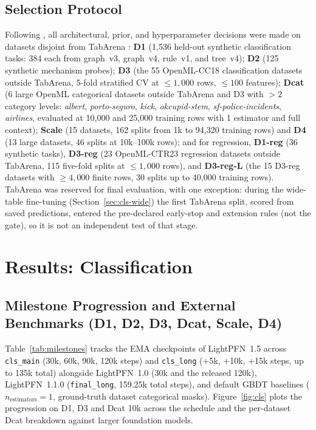\documentclass[11pt]{article}
\begin{document}
\subsection{Selection Protocol}
\label{sec:protocol}

Following \cite[Section~3]{ottoboni2026lightpfn}, all architectural, prior, and hyperparameter decisions were made on datasets disjoint from TabArena \cite{tabarena}:
\textbf{D1} (1,536 held-out synthetic classification tasks: 384 each from graph~v3, graph~v4, rule~v1, and tree~v4);
\textbf{D2} (125 synthetic mechanism probes);
\textbf{D3} (the 55 OpenML-CC18 classification datasets outside TabArena, 5-fold stratified CV at $\le 1{,}000$ rows, $\le 100$ features);
\textbf{Dcat} (6 large OpenML categorical datasets outside TabArena and D3 with $>2$ category levels: \emph{albert}, \emph{porto-seguro}, \emph{kick}, \emph{okcupid-stem}, \emph{sf-police-incidents}, \emph{airlines}, evaluated at 10,000 and 25,000 training rows with 1 estimator and full context); %
\textbf{Scale} (15 datasets, 162 splits from 1k to 94,320 training rows) and \textbf{D4} (13 large datasets, 46 splits at 10k--100k rows);
and for regression, \textbf{D1-reg} (36 synthetic tasks), \textbf{D3-reg} (23 OpenML-CTR23 regression datasets outside TabArena, 115 five-fold splits at $\le 1{,}000$ rows), and \textbf{D3-reg-L} (the 15 D3-reg datasets with $\ge 4{,}000$ finite rows, 30 splits up to 40,000 training rows). %
TabArena was reserved for final evaluation, with one exception: during the wide-table fine-tuning (Section~\ref{sec:cls-wide}) the first TabArena split, scored from saved predictions, entered the pre-declared early-stop and extension rules (not the gate), so it is not an independent test of that stage.

\section{Results: Classification}
\label{sec:cls-results}

\subsection{Milestone Progression and External Benchmarks (D1, D2, D3, Dcat, Scale, D4)}
\label{sec:cls-milestones}

Table~\ref{tab:milestones} tracks the EMA checkpoints of LightPFN~1.5 across \texttt{cls\_main} (30k, 60k, 90k, 120k steps) and \texttt{cls\_long} (+5k, +10k, +15k steps, up to 135k total) alongside LightPFN~1.0 (30k and the released 120k), LightPFN~1.1.0 (\texttt{final\_long}, 159.25k total steps), and default GBDT baselines ($n_{\text{estimators}}=1$, ground-truth dataset categorical masks).
Figure~\ref{fig:cls} plots the progression on D1, D3 and Dcat 10k across the schedule and the per-dataset Dcat breakdown against larger foundation models.
\end{document}
